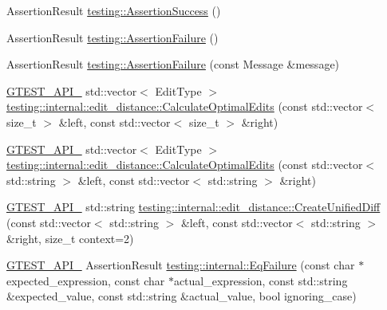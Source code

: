 \begin{DoxyCompactItemize}
\item 
Assertion\+Result \mbox{\hyperlink{namespacetesting_ac1d0baedb17286c5c6c87bd1a45da8ac}{testing\+::\+Assertion\+Success}} ()
\item 
Assertion\+Result \mbox{\hyperlink{namespacetesting_a75cb789614cb1c28c34627a4a3c053df}{testing\+::\+Assertion\+Failure}} ()
\item 
Assertion\+Result \mbox{\hyperlink{namespacetesting_a56f59110a218942d2fc4695914b1685c}{testing\+::\+Assertion\+Failure}} (const Message \&message)
\item 
\mbox{\hyperlink{_obj__test_2lib_2googletest-release-1_88_81_2googletest_2include_2gtest_2internal_2gtest-port_8h_aa73be6f0ba4a7456180a94904ce17790}{G\+T\+E\+S\+T\+\_\+\+A\+P\+I\+\_\+}} std\+::vector$<$ Edit\+Type $>$ \mbox{\hyperlink{namespacetesting_1_1internal_1_1edit__distance_a26323b4c2a29ea8e187aafbd4d2275db}{testing\+::internal\+::edit\+\_\+distance\+::\+Calculate\+Optimal\+Edits}} (const std\+::vector$<$ size\+\_\+t $>$ \&left, const std\+::vector$<$ size\+\_\+t $>$ \&right)
\item 
\mbox{\hyperlink{_obj__test_2lib_2googletest-release-1_88_81_2googletest_2include_2gtest_2internal_2gtest-port_8h_aa73be6f0ba4a7456180a94904ce17790}{G\+T\+E\+S\+T\+\_\+\+A\+P\+I\+\_\+}} std\+::vector$<$ Edit\+Type $>$ \mbox{\hyperlink{namespacetesting_1_1internal_1_1edit__distance_a32267b2ae24de1de175ac8217406877d}{testing\+::internal\+::edit\+\_\+distance\+::\+Calculate\+Optimal\+Edits}} (const std\+::vector$<$ std\+::string $>$ \&left, const std\+::vector$<$ std\+::string $>$ \&right)
\item 
\mbox{\hyperlink{_obj__test_2lib_2googletest-release-1_88_81_2googletest_2include_2gtest_2internal_2gtest-port_8h_aa73be6f0ba4a7456180a94904ce17790}{G\+T\+E\+S\+T\+\_\+\+A\+P\+I\+\_\+}} std\+::string \mbox{\hyperlink{namespacetesting_1_1internal_1_1edit__distance_ac4c24a581ff433d7aca7ed12c9133fb1}{testing\+::internal\+::edit\+\_\+distance\+::\+Create\+Unified\+Diff}} (const std\+::vector$<$ std\+::string $>$ \&left, const std\+::vector$<$ std\+::string $>$ \&right, size\+\_\+t context=2)
\item 
\mbox{\hyperlink{_obj__test_2lib_2googletest-release-1_88_81_2googletest_2include_2gtest_2internal_2gtest-port_8h_aa73be6f0ba4a7456180a94904ce17790}{G\+T\+E\+S\+T\+\_\+\+A\+P\+I\+\_\+}} Assertion\+Result \mbox{\hyperlink{namespacetesting_1_1internal_a08725846ff184d3e79bcf5be4df19157}{testing\+::internal\+::\+Eq\+Failure}} (const char $\ast$expected\+\_\+expression, const char $\ast$actual\+\_\+expression, const std\+::string \&expected\+\_\+value, const std\+::string \&actual\+\_\+value, bool ignoring\+\_\+case)

\end{DoxyCompactItemize}

